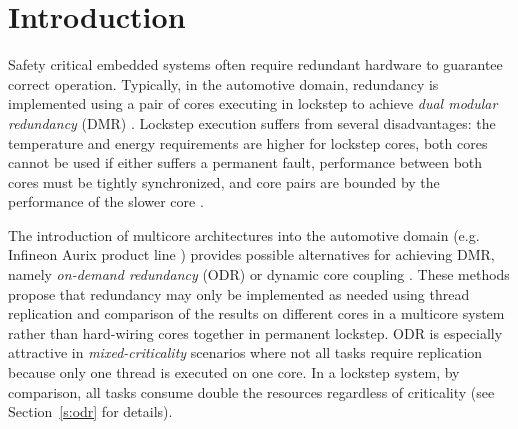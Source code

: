 
\chapter{Introduction} %

\label{c:intro} %


	Safety critical embedded systems often require redundant hardware to guarantee correct operation. 
	Typically, in the automotive domain, redundancy is implemented using a pair of cores executing in lockstep to achieve \emph{dual modular redundancy} (DMR) \cite{baleani2003fault}. 
	Lockstep execution suffers from several disadvantages: the temperature and energy requirements are higher for lockstep cores, both cores cannot be used if either suffers a permanent fault, performance between both cores must be tightly synchronized, and core pairs are bounded by the performance of the slower core \cite{lafrieda2007utilizing}. 
	
	The introduction of multicore architectures into the automotive domain (e.g. Infineon Aurix product line \cite{infineon2014aurix}) provides possible alternatives for achieving DMR, namely \emph{on-demand redundancy} (ODR) \cite{Meyer:CASES11,fu2013demand} or dynamic core coupling \cite{lafrieda2007utilizing}. 
	These methods propose that redundancy may only be implemented as needed using thread replication and comparison of the results on different cores in a multicore system rather than hard-wiring cores together in permanent lockstep. 
	ODR is especially attractive in \emph{mixed-criticality} scenarios where not all tasks require replication because only one thread is executed on one core.
	In a lockstep system, by comparison, all tasks consume double the resources regardless of criticality (see Section~\ref{s:odr} for details).


